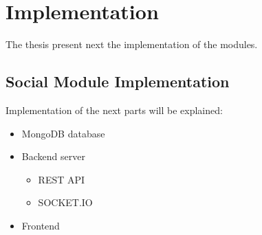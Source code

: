 \chapter{Implementation}
\label{chapter:implementation}
The thesis present next the implementation of the modules.


\section{Social Module Implementation}
\label{sec:implementation-callapp}
Implementation of the next parts will be explained:
\begin{itemize}
  \item MongoDB database
  \item Backend server
    \begin{itemize}
        \item REST API
        \item SOCKET.IO
    \end{itemize}
  \item Frontend
\end{itemize}


